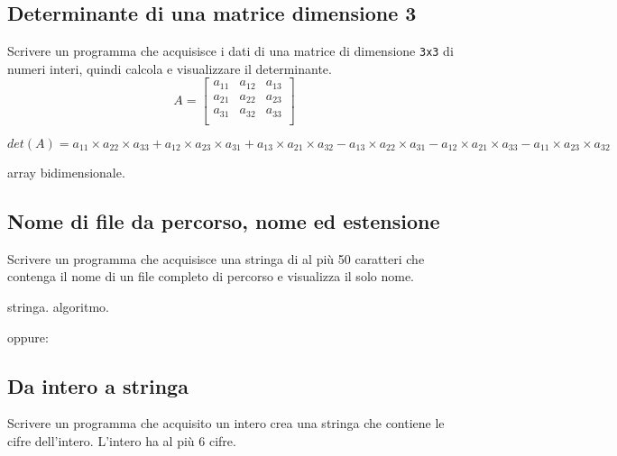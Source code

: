 \subsection{Determinante di una matrice dimensione 3}

Scrivere un programma che acquisisce i dati di una matrice di dimensione \texttt{3x3} di numeri interi, quindi calcola e visualizzare il determinante.
\[
A = 
\begin{bmatrix}
a_{11} & a_{12} & a_{13} \\
a_{21} & a_{22} & a_{23} \\
a_{31} & a_{32} & a_{33} \\
\end{bmatrix}
\]

{\small
$$ det(A) = a_{11}\times a_{22}  \times a_{33}  + a_{12} \times a_{23}\times a_{31}  + a_{13} \times a_{21} \times a_{32} - a_{13} \times a_{22} \times a_{31} - a_{12} \times a_{21} \times a_{33} - a_{11} \times a_{23} \times a_{32} $$}

\begin{tags}
array bidimensionale.
\end{tags}

%

\subsection{Nome di file da percorso, nome ed estensione}
Scrivere un programma che acquisisce una stringa di al pi\`u 50 caratteri che contenga il nome di un file completo di percorso e visualizza il solo nome. 

\begin{tags}
stringa. algoritmo.
\end{tags}

\begin{esame}
\end{esame}



oppure:




\subsection{Da intero a stringa}
Scrivere un programma che acquisito un intero crea una stringa che contiene le cifre dell'intero. L'intero ha al pi\`u 6 cifre. 

